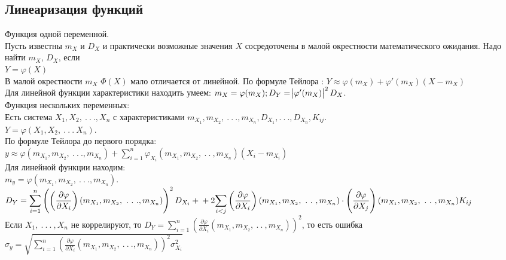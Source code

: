 \documentclass[russian, 12pt, fleqn,x11names]{article}
\begin{document}
\subsection{Линеаризация функций}
\noindent
Функция одной переменной. \\
Пусть известны $m_X$ и $D_X$ и практически возможные значения $X$ сосредоточены в малой окрестности математического ожидания. Надо найти $m_X$, $D_X$, если \\
$Y = \varphi(X)$\\
В малой окрестности $m_X$ $\Phi(X)$ мало отличается от линейной. По формуле Тейлора : $Y \approx \varphi(m_X) + \varphi'(m_X) (X  - m_X)$\\
Для линейной функции характеристики находить умеем: $m_X = \varphi(m_X);\\ D_Y = \abs{\varphi'(m_X)}^2 D_X$.\\
Функция нескольких переменных:\\
Есть система $X_1, X_2,\ .\ .\ . ,X_n$ с характеристиками $m_{X_1}, m_{X_2}, \ .\ .\ .  ,m_{X_n}, D_{X_1},.\ .\ ., D_{X_n}, K_{ij}$.\\
$Y=\varphi(X_1, X_2, \ .\ .\ .\  X_n)$.\\
По формуле Тейлора до первого порядка:\\
 $y  \approx  \varphi(m_{X_1}, m_{X_2}, \ .\ .\ .  ,m_{X_n}) + \displaystyle{\sum \limits _{i  = 1} ^ {n} } \varphi_{X_i} (m_{X_1}, m_{X_2}, \ .\ .\ ,m_{X_n})(X_i - m_{X_i})$\\
Для линейной функции находим:\\
$m_y =  \varphi(m_{X_1}, m_{X_2}, \ .\ .\ . ,m_{X_n}) $. $D_Y =  \displaystyle{\sum \limits _{i  = 1} ^ {n} \left(  \left (\frac{\partial \varphi}{\partial X_i}\right )(m_{X_1}, m_{X_2}, \ .\ .\ . , m_{X_n}) \right)^2D_{X_i}}  + \\ + 2\displaystyle{\sum \limits _{i  < j} \left (\frac{\partial \varphi}{\partial X_i} \right )  \left (m_{X_1}, m_{X_2}, \ .\ .\ ,m_{X_n} \right )  \cdot \left (\frac{\partial \varphi}{\partial X_j}\right ) (m_{X_1}, m_{X_2}, \ .\ .\ ,m_{X_n}) K_{ij}}$\\
Если $X_1, \ .\ .\ .\ ,X_n$ не коррелируют, то $D_Y =  \displaystyle{\sum \limits _{i  = 1} ^ {n}\left (\frac{\partial \varphi}{\partial X_i} (m_{X_1}, m_{X_2}, \ .\ .\ ,m_{X_n}) \right )^2}$, то есть ошибка $\sigma_y  = \sqrt{\displaystyle{\sum \limits _{i  = 1} ^ {n}  \left (\frac{\partial \varphi}{\partial X_i}(m_{X_1}, m_{X_2}, \ .\ .\ . , m_{X_n})\right )^2 \sigma_{X_i}^2}}$\\
\end{document}
